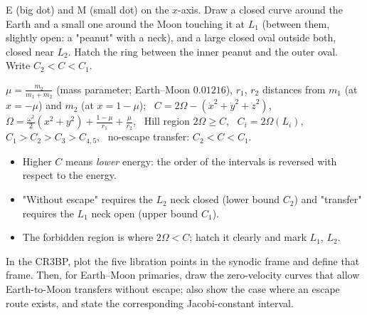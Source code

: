 \begin{fig2draw}
E (big dot) and M (small dot) on the $x$-axis. Draw a closed curve around the Earth and a small one around the Moon touching
it at $L_1$ (between them, slightly open: a "peanut" with a neck), and a large closed oval outside both, closed near $L_2$.
Hatch the ring between the inner peanut and the outer oval. Write $C_2<C<C_1$.
\end{fig2draw}

\begin{keyf}
$\mu=\frac{m_2}{m_1+m_2}$ (mass parameter; Earth--Moon $0.01216$), $r_1$, $r_2$ distances from $m_1$ (at $x=-\mu$) and $m_2$ (at $x=1-\mu$); \
$C=2\Omega-(\dot x^2+\dot y^2+\dot z^2)$, \ $\Omega=\frac{\omega^2}{2}(x^2+y^2)+\frac{1-\mu}{r_1}+\frac{\mu}{r_2}$, \
Hill region $2\Omega\ge C$, \ $C_i=2\Omega(L_i)$, \ $C_1>C_2>C_3>C_{4,5}$, \ no-escape transfer: $C_2<C<C_1$.
\end{keyf}

\pitfalls
\begin{itemize}
\item Higher $C$ means \emph{lower} energy: the order of the intervals is reversed with respect to the energy.
\item "Without escape" requires the $L_2$ neck closed (lower bound $C_2$) and "transfer" requires the $L_1$ neck open (upper bound $C_1$).
\item The forbidden region is where $2\Omega<C$; hatch it clearly and mark $L_1$, $L_2$.
\end{itemize}


\begin{qbox}
In the CR3BP, plot the five libration points in the synodic frame and define that frame. Then, for Earth--Moon primaries,
draw the zero-velocity curves that allow Earth-to-Moon transfers without escape; also show the case where an escape route
exists, and state the corresponding Jacobi-constant interval.
\end{qbox}

